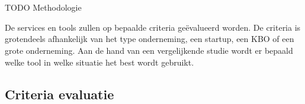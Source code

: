 
\chapter{}
\label{ch:methodologie}


TODO Methodologie

De services en tools zullen op bepaalde criteria geëvalueerd worden.
De criteria is grotendeels afhankelijk van het type onderneming, een startup, een KBO of een grote onderneming.
Aan de hand van een vergelijkende studie wordt er bepaald welke tool in welke situatie het best wordt gebruikt.


\section{Criteria evaluatie}
\label{sec:criteria-evaluatie}

